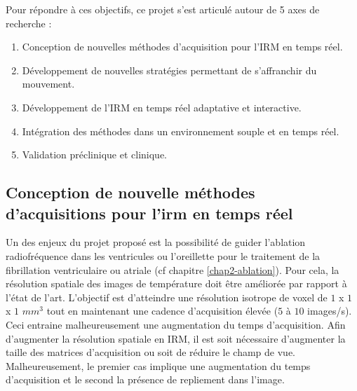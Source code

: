Pour répondre à ces objectifs, ce projet s’est articulé autour de 5 axes de recherche :

\begin{enumerate} 
\item Conception de nouvelles méthodes d’acquisition pour l’IRM en temps réel.
\item Développement de nouvelles stratégies permettant de s’affranchir du mouvement.
\item Développement de l’IRM en temps réel adaptative et interactive.
\item Intégration des méthodes dans un environnement souple et en temps réel.
\item Validation préclinique et clinique.
\end{enumerate}

\subsection{Conception de nouvelle méthodes d'acquisitions pour l'irm en temps réel}

Un des enjeux du projet proposé est la possibilité de guider l’ablation radiofréquence dans les ventricules ou l'oreillette pour le traitement de la fibrillation ventriculaire ou atriale (cf chapitre \ref{chap2-ablation}). Pour cela, la résolution spatiale des images de température doit être améliorée par rapport à l’état de l’art. L’objectif est d’atteindre une résolution isotrope de voxel de $1$ x $1$ x $1$ $mm^3$ tout en maintenant une cadence d’acquisition élevée ($5$ à $10$ images/s). Ceci entraine malheureusement une augmentation du temps d’acquisition. Afin d’augmenter la résolution spatiale en IRM, il est soit nécessaire d’augmenter la taille des matrices d’acquisition ou soit de réduire le champ de vue. Malheureusement, le premier cas implique une augmentation du temps d’acquisition et le second la présence de repliement dans l’image.\\
